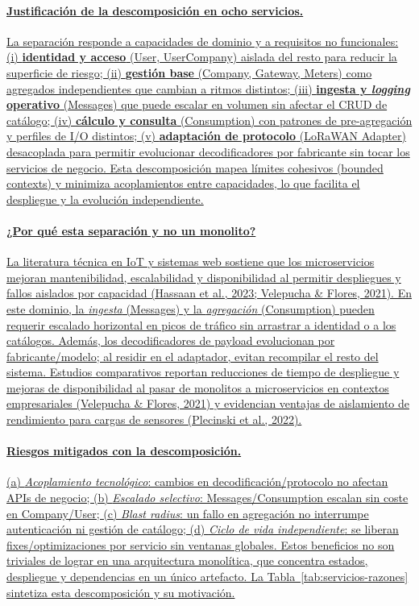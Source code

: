 \documentclass[12pt,a4paper,oneside]{report}
\providecommand{\ul}[1]{\uline{#1}}
\begin{document}
\paragraph{\ul{Justificación de la descomposición en ocho servicios.}} \ul{La separación responde a capacidades de dominio y a requisitos no funcionales: (i) \textbf{identidad y acceso} (User, UserCompany) aislada del resto para reducir la superficie de riesgo; (ii) \textbf{gestión base} (Company, Gateway, Meters) como agregados independientes que cambian a ritmos distintos; (iii) \textbf{ingesta y \textit{logging} operativo} (Messages) que puede escalar en volumen sin afectar el CRUD de catálogo; (iv) \textbf{cálculo y consulta} (Consumption) con patrones de pre-agregación y perfiles de I/O distintos; (v) \textbf{adaptación de protocolo} (LoRaWAN Adapter) desacoplada para permitir evolucionar decodificadores por fabricante sin tocar los servicios de negocio. Esta descomposición mapea límites cohesivos (bounded contexts) y minimiza acoplamientos entre capacidades, lo que facilita el despliegue y la evolución independiente.}

\paragraph{\ul{¿Por qué esta separación y no un monolito?}} \ul{La literatura técnica en IoT y sistemas web sostiene que los microservicios mejoran mantenibilidad, escalabilidad y disponibilidad al permitir despliegues y fallos aislados por capacidad (Hassaan et al., 2023; Velepucha \& Flores, 2021). En este dominio, la \textit{ingesta} (Messages) y la \textit{agregación} (Consumption) pueden requerir escalado horizontal en picos de tráfico sin arrastrar a identidad o a los catálogos. Además, los decodificadores de payload evolucionan por fabricante/modelo; al residir en el adaptador, evitan recompilar el resto del sistema. Estudios comparativos reportan reducciones de tiempo de despliegue y mejoras de disponibilidad al pasar de monolitos a microservicios en contextos empresariales (Velepucha \& Flores, 2021) y evidencian ventajas de aislamiento de rendimiento para cargas de sensores (Plecinski et al., 2022).}

\paragraph{\ul{Riesgos mitigados con la descomposición.}} \ul{(a) \textit{Acoplamiento tecnológico}: cambios en decodificación/protocolo no afectan APIs de negocio; (b) \textit{Escalado selectivo}: Messages/Consumption escalan sin coste en Company/User; (c) \textit{Blast radius}: un fallo en agregación no interrumpe autenticación ni gestión de catálogo; (d) \textit{Ciclo de vida independiente}: se liberan fixes/optimizaciones por servicio sin ventanas globales. Estos beneficios no son triviales de lograr en una arquitectura monolítica, que concentra estados, despliegue y dependencias en un único artefacto. La Tabla~\ref{tab:servicios-razones} sintetiza esta descomposición y su motivación.}
\end{document}
